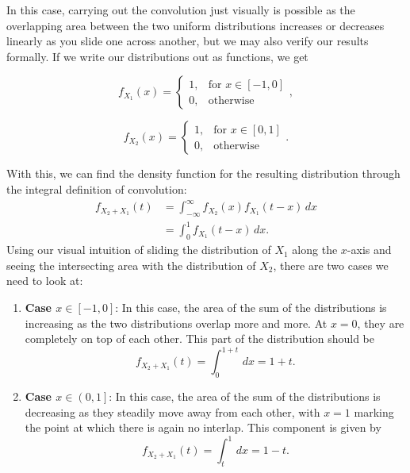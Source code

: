 In this case, carrying out the convolution just visually is possible as the
overlapping area between the two uniform distributions increases or decreases
linearly as you slide one across another, but we may also verify our results formally. If we write our distributions out as functions, we get

\begin{multicols}{2}
    \[
        f_{X_1} \left( x \right) = \begin{cases}
            1, & \text{for } x \in \left[ -1, 0 \right] \\
            0, & \text{otherwise}
        \end{cases}
    ,\]

    \[
        f_{X_2} \left( x \right) = \begin{cases}
            1, & \text{for } x \in \left[ 0, 1 \right] \\
            0, & \text{otherwise}
        \end{cases}
    .\]
\end{multicols}
 With this,
we can find the density function for the resulting distribution through the
integral definition of convolution:
\begin{align*}
    f_{X_2 + X_1} \left( t \right) &= \int_{-\infty}^{\infty} f_{X_2} \left( x \right) f_{X_1} \left( t - x \right) \, dx \\
    &= \int_{0}^{1} f_{X_1} \left( t - x \right) \, dx
.\end{align*}
Using our visual intuition of sliding the distribution of \( X_1 \) along the
\( x \)-axis and seeing the intersecting area with the distribution of \( X_2
\), there are two cases we need to look at:
\begin{enumerate}
    \item \textbf{Case \( x \in \left[ -1, 0 \right] \)}:
    In this case, the area of the sum of the distributions is increasing as the
    two distributions overlap more and more. At \( x = 0 \), they are
    completely on top of each other. This part of the distribution should be
    \[
        f_{X_2 + X_1} \left( t \right) = \int_{0}^{1 + t} \, dx = 1 + t
    .\]

    \item \textbf{Case \( x \in \left( 0, 1 \right] \)}:
    In this case, the area of the sum of the distributions is decreasing as
    they steadily move away from each other, with \( x = 1 \) marking the point
    at which there is again no interlap. This component is given by
    \[
        f_{X_2 + X_1} \left( t \right) = \int_{t}^{1}  \, dx = 1 - t
    .\]
\end{enumerate}

